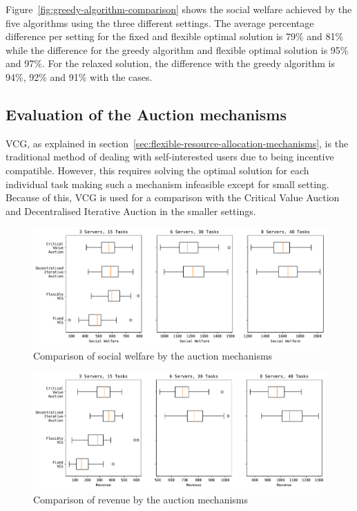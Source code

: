Figure~\ref{fig:greedy-algorithm-comparison} shows the social welfare achieved by the five algorithms using the
three different settings. The average percentage difference per setting for the fixed and flexible optimal solution is
79\% and 81\% while the difference for the greedy algorithm and flexible optimal solution is 95\% and 97\%. For
the relaxed solution, the difference with the greedy algorithm is 94\%, 92\% and 91\% with the cases.

\subsection{Evaluation of the Auction mechanisms}\label{subsec:evaluation-of-the-auction-mechanisms}
VCG, as explained in section~\ref{sec:flexible-resource-allocation-mechanisms}, is the traditional method of dealing
with self-interested users due to being incentive compatible. However, this requires solving the optimal solution
for each individual task making such a mechanism infeasible except for small setting. Because of this, VCG is used for
a comparison with the Critical Value Auction and Decentralised Iterative Auction in the smaller settings.

\begin{figure}[h]
    \centering
    \includegraphics[width=\linewidth]{figs/auctions/multi_setting_social_welfare.pdf}
    \caption{Comparison of social welfare by the auction mechanisms}
    \label{fig:auction-mechanisms-social-welfare}
\end{figure}

\begin{figure}[h]
    \centering
    \includegraphics[width=\linewidth]{figs/auctions/multi_setting_revenue.pdf}
    \caption{Comparison of revenue by the auction mechanisms}
    \label{fig:auction-mechanisms-revenue}
\end{figure}

